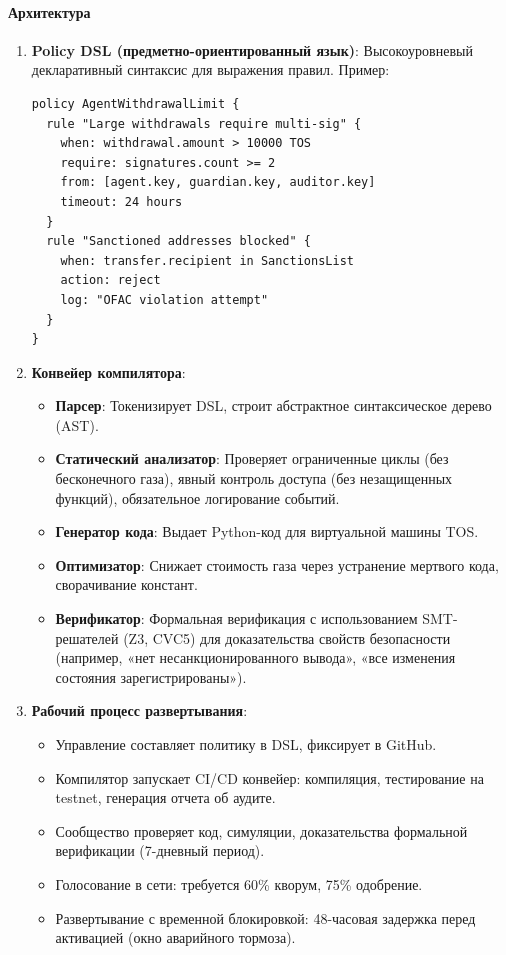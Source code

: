 \documentclass[11pt]{article}
\begin{document}
\paragraph{Архитектура}
\begin{enumerate}[noitemsep]
  \item \textbf{Policy DSL (предметно-ориентированный язык)}: Высокоуровневый декларативный синтаксис для выражения правил. Пример:
  \begin{verbatim}
policy AgentWithdrawalLimit {
  rule "Large withdrawals require multi-sig" {
    when: withdrawal.amount > 10000 TOS
    require: signatures.count >= 2
    from: [agent.key, guardian.key, auditor.key]
    timeout: 24 hours
  }
  rule "Sanctioned addresses blocked" {
    when: transfer.recipient in SanctionsList
    action: reject
    log: "OFAC violation attempt"
  }
}
  \end{verbatim}
  \item \textbf{Конвейер компилятора}:
    \begin{itemize}[noitemsep]
      \item \textbf{Парсер}: Токенизирует DSL, строит абстрактное синтаксическое дерево (AST).
      \item \textbf{Статический анализатор}: Проверяет ограниченные циклы (без бесконечного газа), явный контроль доступа (без незащищенных функций), обязательное логирование событий.
      \item \textbf{Генератор кода}: Выдает Python-код для виртуальной машины TOS.
      \item \textbf{Оптимизатор}: Снижает стоимость газа через устранение мертвого кода, сворачивание констант.
      \item \textbf{Верификатор}: Формальная верификация с использованием SMT-решателей (Z3, CVC5) для доказательства свойств безопасности (например, «нет несанкционированного вывода», «все изменения состояния зарегистрированы»).
    \end{itemize}
  \item \textbf{Рабочий процесс развертывания}:
    \begin{itemize}[noitemsep]
      \item Управление составляет политику в DSL, фиксирует в GitHub.
      \item Компилятор запускает CI/CD конвейер: компиляция, тестирование на testnet, генерация отчета об аудите.
      \item Сообщество проверяет код, симуляции, доказательства формальной верификации (7-дневный период).
      \item Голосование в сети: требуется 60\% кворум, 75\% одобрение.
      \item Развертывание с временной блокировкой: 48-часовая задержка перед активацией (окно аварийного тормоза).
    \end{itemize}
\end{enumerate}
\end{document}
